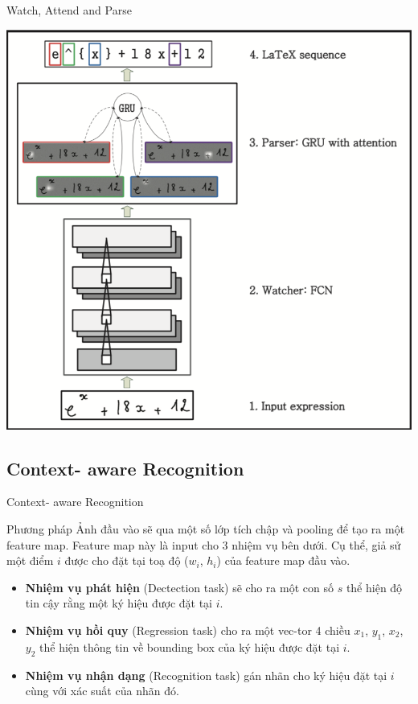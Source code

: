 \documentclass{beamer}
\begin{document}
	\begin{frame}{Watch, Attend and Parse}
		\begin{center}
			\centering
			\includegraphics[width=0.5\linewidth]{WAP}
			\vspace{0.5cm}
		\end{center}
	\end{frame}
	\subsection{Context- aware Recognition}
	\begin{frame}{Context- aware Recognition}
		\begin{block}{Phương pháp}
			Ảnh đầu vào sẽ qua một số lớp tích chập và pooling để tạo ra một feature map. Feature map này là input cho 3 nhiệm vụ bên dưới. Cụ thể,
			giả sử một điểm $i$ được cho đặt tại toạ độ ($w_i$, $h_i$) của feature map đầu vào. 
			\begin{itemize}
				\item \textbf{Nhiệm vụ phát hiện} (Dectection task) sẽ cho ra một con số $s$ thể hiện độ tin cậy rằng một ký hiệu được đặt tại $i$.
				\item \textbf{Nhiệm vụ hồi quy} (Regression task) cho ra một vec-tor 4 chiều {$x_1$, $y_1$, $x_2$, $y_2$} thể hiện thông tin về bounding box của ký hiệu được đặt tại $i$.
				\item\textbf{Nhiệm vụ nhận dạng} (Recognition task) gán nhãn cho ký hiệu đặt tại $i$ cùng với xác suất của nhãn đó. 
			\end{itemize}
			
		\end{block}
	\end{frame}
	
\end{document}
